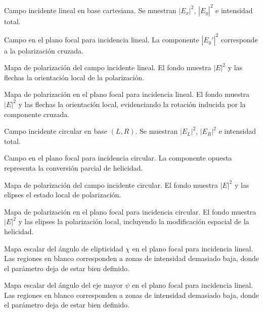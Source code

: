 \caption{Campo incidente lineal en base cartesiana. Se muestran $|E_x|^2$, $|E_y|^2$ e intensidad total.}
\label{fig:lineal-incidente-componentes}

\caption{Campo en el plano focal para incidencia lineal. La componente $|E_y'|^2$ corresponde a la polarización cruzada.}
\label{fig:lineal-plano-focal-componentes}

\caption{Mapa de polarización del campo incidente lineal. El fondo muestra $|E|^2$ y las flechas la orientación local de la polarización.}
\label{fig:lineal-incidente-mapa-polarizacion}

\caption{Mapa de polarización en el plano focal para incidencia lineal. El fondo muestra $|E|^2$ y las flechas la orientación local, evidenciando la rotación inducida por la componente cruzada.}
\label{fig:lineal-plano-focal-mapa-polarizacion}

\caption{Campo incidente circular en base $(L,R)$. Se muestran $|E_L|^2$, $|E_R|^2$ e intensidad total.}
\label{fig:circular-incidente-componentes}

\caption{Campo en el plano focal para incidencia circular. La componente opuesta representa la conversión parcial de helicidad.}
\label{fig:circular-plano-focal-componentes}

\caption{Mapa de polarización del campo incidente circular. El fondo muestra $|E|^2$ y las elipses el estado local de polarización.}
\label{fig:circular-incidente-mapa-polarizacion}

\caption{Mapa de polarización en el plano focal para incidencia circular. El fondo muestra $|E|^2$ y las elipses la polarización local, incluyendo la modificación espacial de la helicidad.}
\label{fig:circular-plano-focal-mapa-polarizacion}

\caption{Mapa escalar del ángulo de elipticidad $\chi$ en el plano focal para incidencia lineal. Las regiones en blanco corresponden a zonas de intensidad demasiado baja, donde el parámetro deja de estar bien definido.}
\label{fig:lineal-plano-focal-elipticidad}

\caption{Mapa escalar del ángulo del eje mayor $\psi$ en el plano focal para incidencia lineal. Las regiones en blanco corresponden a zonas de intensidad demasiado baja, donde el parámetro deja de estar bien definido.}
\label{fig:lineal-plano-focal-psi}


